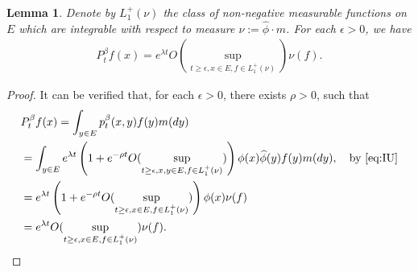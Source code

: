 \documentclass[12pt,a4paper]{amsart}
\numberwithin{equation}{section}
\theoremstyle{plain}
\newtheorem{lem}[thm]{Lemma}
\theoremstyle{definition}
\begin{document}
\begin{lem}
\label{lem:Pf_and_fnu}
  Denote by $L_1^+(\nu)$ the class of non-negative measurable functions on $E$ which are integrable with respect to measure $\nu:= \widehat\phi \cdot m$.
For each $\epsilon > 0$, we have
  \begin{align}
    P^\beta_t f(x) = e^{\lambda t} O(\sup_{t\geq \epsilon, x\in E, f\in L_1^+(\nu)}) \nu(f).  
  \end{align}
\end{lem}
\begin{proof}
  It can be verified that, for each $\epsilon > 0$, there exists $\rho > 0$, such that
  \begin{align}
    & P^\beta_t f(x) = \int_{y\in E} p^\beta_t (x,y)f(y) m(dy)
    \\&  = \int_{y\in E}  e^{\lambda t}\left (1+ e^{-\rho t} O(\sup_{t \geq \epsilon, x,y\in E, f\in L_1^+(\nu)})\right)\phi(x) \widehat \phi(y) f(y) m(dy) ,\quad\text{by~\eqref{eq:IU}}
    \\&  =   e^{\lambda t}\left(1+ e^{-\rho t} O(\sup_{t \geq \epsilon, x\in E, f\in L_1^+(\nu)})\right)\phi(x) \nu(f) \label{eq:IU_for_Ptf} 
    \\&= e^{\lambda t} O(\sup_{t\geq \epsilon, x\in E, f\in L_1^+(\nu)}) \nu(f). 
\qedhere 
  \end{align}
\end{proof}
\end{document}
